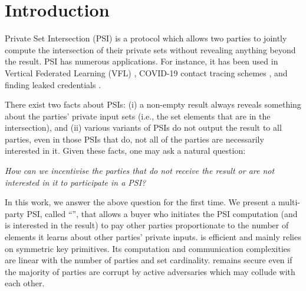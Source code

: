 




\section{Introduction}


Private Set Intersection (PSI) is a protocol which allows two parties to jointly compute the intersection of their private sets without revealing anything beyond the result. 
%
PSI has numerous applications. For instance, it has been used in Vertical Federated Learning (VFL) \cite{LuD20}, COVID-19 contact tracing schemes  \cite{DBLP:conf/asiacrypt/DuongPT20}, and finding leaked credentials \cite{ThomasPYRKIBPPB19}. %



There exist two facts about PSIs: (i) a non-empty result always reveals something about the parties' private input sets (i.e., the set elements that are in the intersection), and (ii) various variants of PSIs do not output the result to all parties, even in those PSIs that do,  not all of the parties are necessarily interested in it.  Given these facts, one may ask a natural question:  

\vs

\begin{center}
\emph{How can we incentivise the parties that do not receive the result or are not interested in it to participate in a PSI?}
\end{center}

\vs


%
In this work, we answer the above question for the first time. We present a multi-party PSI, called ``\withRew'', that allows a buyer who initiates the PSI computation (and is interested in the result) to pay other parties proportionate to the number of elements it learns about other parties' private inputs.  \withRew is efficient and mainly relies on symmetric key primitives.  Its computation and communication complexities are linear with the number of parties and set cardinality. \withRew remains secure even if the majority of parties are corrupt by active adversaries which may collude with each other. 




